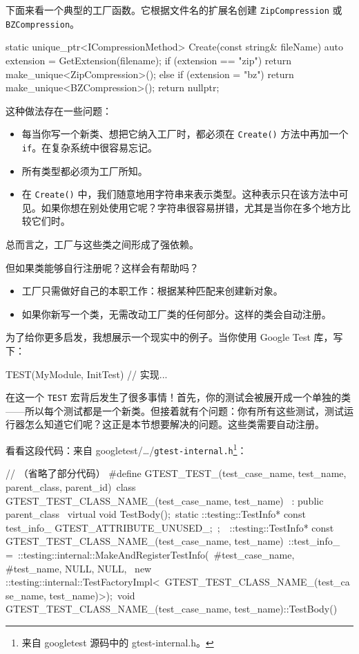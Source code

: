 下面来看一个典型的工厂函数。它根据文件名的扩展名创建 \texttt{ZipCompression} 或 \texttt{BZCompression}。

\begin{codebox}[cpp]
static unique_ptr<ICompressionMethod> Create(const string& fileName) {
auto extension = GetExtension(filename);
if (extension == "zip")
return make_unique<ZipCompression>();
else if (extension = "bz")
return make_unique<BZCompression>();
return nullptr;
}
\end{codebox}

这种做法存在一些问题：

\begin{itemize}
\item 每当你写一个新类、想把它纳入工厂时，都必须在 \texttt{Create()} 方法中再加一个 \texttt{if}。在复杂系统中很容易忘记。
\item 所有类型都必须为工厂所知。
\item 在 \texttt{Create()} 中，我们随意地用字符串来表示类型。这种表示只在该方法中可见。如果你想在别处使用它呢？字符串很容易拼错，尤其是当你在多个地方比较它们时。
\end{itemize}


总而言之，工厂与这些类之间形成了强依赖。

但如果类能够自行注册呢？这样会有帮助吗？

\begin{itemize}
\item 工厂只需做好自己的本职工作：根据某种匹配来创建新对象。
\item 如果你新写一个类，无需改动工厂类的任何部分。这样的类会自动注册。
\end{itemize}

为了给你更多启发，我想展示一个现实中的例子。当你使用 Google Test 库，写下：

\begin{codebox}[cpp]
TEST(MyModule, InitTest) {
// 实现...
}
\end{codebox}

在这一个 \texttt{TEST} 宏背后发生了很多事情！首先，你的测试会被展开成一个单独的类——所以每个测试都是一个新类。但接着就有个问题：你有所有这些测试，测试运行器怎么知道它们呢？这正是本节想要解决的问题。这些类需要自动注册。

看看这段代码：来自 googletest/…/\texttt{gtest-internal.h}\footnote{来自 googletest 源码中的 gtest-internal.h。}：

\begin{codebox}[cpp]
// （省略了部分代码）
#define GTEST_TEST_(test_case_name, test_name, parent_class, parent_id)\
class GTEST_TEST_CLASS_NAME_(test_case_name, test_name) \
: public parent_class { \
virtual void TestBody();\
static ::testing::TestInfo* const test_info_ GTEST_ATTRIBUTE_UNUSED_;\
};\
\
::testing::TestInfo* const GTEST_TEST_CLASS_NAME_(test_case_name, test_name)\
::test_info_ =\
::testing::internal::MakeAndRegisterTestInfo(\
#test_case_name, #test_name, NULL, NULL, \
new ::testing::internal::TestFactoryImpl<\
GTEST_TEST_CLASS_NAME_(test_case_name, test_name)>);\
void GTEST_TEST_CLASS_NAME_(test_case_name, test_name)::TestBody()
\end{codebox}

